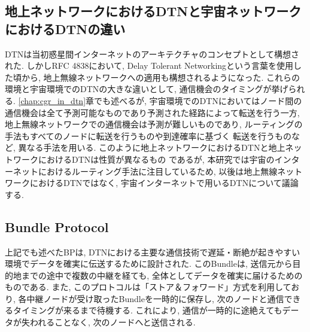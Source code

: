 

\subsection{地上ネットワークにおけるDTNと宇宙ネットワークにおけるDTNの違い}
DTNは当初惑星間インターネットのアーキテクチャのコンセプトとして構想された. しかしRFC 4838\cite{rfc4838}において, 
Delay Tolerant Networkingという言葉を使用した頃から, 地上無線ネットワークへの適用も構想されるようになった. 
これらの環境と宇宙環境でのDTNの大きな違いとして, 通信機会のタイミングが挙げられる. 
\ref{chap:cgr_in_dtn}章でも述べるが, 
宇宙環境でのDTNにおいてはノード間の通信機会は全て予測可能なものであり予測された経路によって転送を行う一方, 
地上無線ネットワークでの通信機会は予測が難しいものであり, ルーティングの手法もすべてのノードに転送を行うものや到達確率に基づく
転送を行うものなど, 異なる手法を用いる. このように地上ネットワークにおけるDTNと地上ネットワークにおけるDTNは性質が異なるもの
であるが, 本研究では宇宙のインターネットにおけるルーティング手法に注目しているため, 以後は地上無線ネットワークにおけるDTNではなく, 
宇宙インターネットで用いるDTNについて議論する. 

\subsection{Bundle Protocol}
\label{subsection:Bundle Protocol}
上記でも述べたBPは, DTNにおける主要な通信技術で遅延・断絶が起きやすい環境でデータを確実に伝送するために設計された. 
このBundleは,  送信元から目的地までの途中で複数の中継を経ても, 全体としてデータを確実に届けるためのものである.  
また, このプロトコルは「ストア＆フォワード」方式を利用しており,  各中継ノードが受け取ったBundleを一時的に保存し,  
次のノードと通信できるタイミングが来るまで待機する.  これにより, 通信が一時的に途絶えてもデータが失われることなく,  次のノードへと送信される. 

